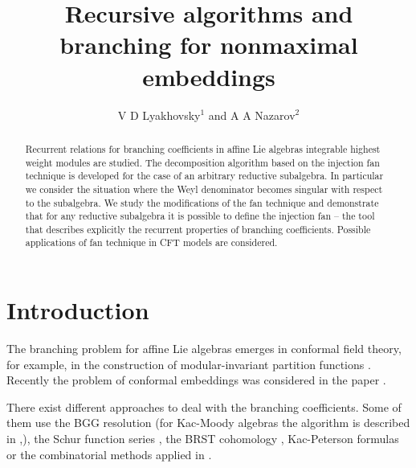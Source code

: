 \documentclass[12pt]{iopart}
\theoremstyle{definition}
\begin{document}
\title{Recursive algorithms and branching for nonmaximal embeddings}
\author{V D Lyakhovsky$^1$ and A A Nazarov$^2$}
\address{$^{1,2}$ Theoretical Department, SPb State University,
198904, Sankt-Petersburg, Russia }

\begin{abstract}
  Recurrent relations for branching coefficients in affine Lie algebras
  integrable highest weight modules are studied. The decomposition algorithm
  based on the injection fan technique is developed for the case of an arbitrary
  reductive subalgebra. In particular we consider the situation where
  the Weyl denominator becomes singular with respect to the subalgebra.
  We study the modifications of the fan technique and demonstrate
  that for any reductive subalgebra it is possible to define the
  injection fan -- the tool that describes
  explicitly the recurrent properties of branching coefficients.
  Possible applications of fan technique in CFT models are considered.
\end{abstract}
\submitto{\JPA}

\section{Introduction}
\label{sec:introduction}

The branching problem for affine Lie algebras emerges in conformal field theory, for example,
in the construction of modular-invariant partition functions \cite{difrancesco1997cft}.
Recently the problem of conformal embeddings was considered in the paper \cite{coquereaux2008conformal}.

There exist different approaches to deal with the branching coefficients. Some of them use the BGG
resolution \cite{bernstein1975differential} (for Kac-Moody algebras the algorithm is described in
\cite{kac1990idl},\cite{wakimoto2001idl}), the Schur function series \cite{fauser2006new}, the BRST
cohomology \cite{Hwang:1994yr}, Kac-Peterson formulas \cite{kac1990idl,quella2002branching} or the
combinatorial methods applied in \cite{feigin707principal}.
\end{document}
